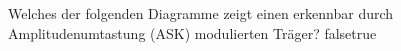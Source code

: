     {Welches der folgenden Diagramme zeigt einen erkennbar durch Amplitudenumtastung (ASK) modulierten Träger?}
    {}
    {}
    {}
    {}
    {false}{true}